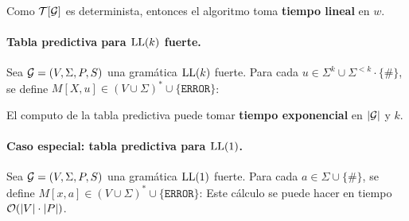 Como $\mathcal{T}[\mathcal{G}]$ es determinista, entonces el algoritmo toma \textbf{tiempo lineal} en $w$.

\paragraph{Tabla predictiva para $\text{LL}(k)$ fuerte.} Sea $\mathcal{G}=(V,\Sigma, P, S)$ una gramática $\text{LL}(k)$ fuerte. Para cada $u \in \Sigma^k \cup \Sigma^{<k}\cdot \{\#\}$, se define $M[X,u] \in (V\cup \Sigma)^* \cup \{\texttt{ERROR}\}$:

El computo de la tabla predictiva puede tomar \textbf{tiempo exponencial} en $|\mathcal{G}|$ y $k$.

\paragraph{Caso especial: tabla predictiva para $\text{LL}(1)$.} Sea $\mathcal{G}=(V,\Sigma, P, S)$ una gramática $\text{LL}(1)$ fuerte. Para cada $a \in \Sigma \cup \{\#\}$, se define $M[x,a] \in (V \cup \Sigma)^* \cup \{\texttt{ERROR}\}$:
Este cálculo se puede hacer en tiempo $\mathcal{O}(|V|\cdot|P|)$.

